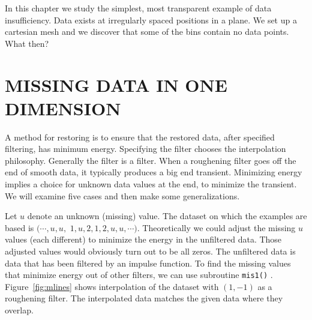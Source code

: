 \par
In this chapter we study the simplest, most transparent example
of data insufficiency.
Data exists at irregularly spaced positions in a plane.
We set up a cartesian mesh and we discover that some
of the bins contain no data points.
What then?

\section{MISSING DATA IN ONE DIMENSION}
\par
A method for restoring  is to ensure that the restored data,
after specified filtering, has minimum energy.
Specifying the filter chooses the interpolation philosophy.
Generally the filter is a  filter.
When a roughening filter goes off the end of smooth data,
it typically produces a big end transient.
Minimizing energy implies a choice for unknown data values
at the end, to minimize the transient.
We will examine five cases and then make some generalizations.
\par
{}
\par
Let $u$ denote an unknown (missing) value.
The dataset on which the examples are based is
$(\cdots, u, u,$ 
$1, u, 2, 1, 2, u, u, \cdots )$.
Theoretically we could adjust the missing $u$ values (each different)
to minimize the energy in the unfiltered data.
Those adjusted values would obviously turn out to be all zeros.
The unfiltered data is data that has been filtered by
an impulse function.
To find the missing values
that minimize energy out of other filters,
we can use subroutine \texttt{mis1()} .
Figure~\ref{fig:mlines}
shows interpolation of the dataset with $(1,-1)$ as a roughening filter.
The interpolated data matches the given data where they overlap.%
